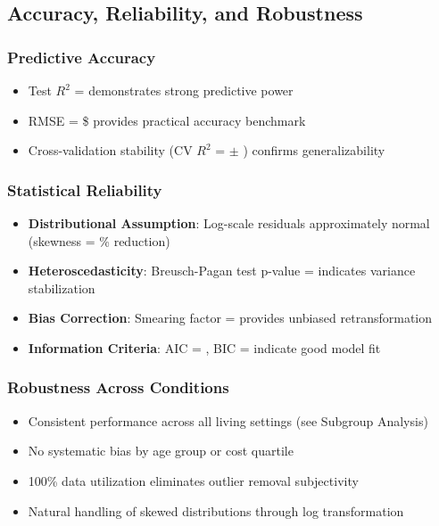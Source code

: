 \subsection{Accuracy, Reliability, and Robustness}

\subsubsection{Predictive Accuracy}
\begin{itemize}
    \item Test $R^2$ = \ModelSixRSquaredTest{} demonstrates strong predictive power
    \item RMSE = \$\ModelSixRMSETest{} provides practical accuracy benchmark
    \item Cross-validation stability (CV $R^2$ = \ModelSixCVMean{} $\pm$ \ModelSixCVStd{}) confirms generalizability
\end{itemize}

\subsubsection{Statistical Reliability}
\begin{itemize}
    \item \textbf{Distributional Assumption}: Log-scale residuals approximately normal (skewness = \ModelSixSkewnessReduction{}\% reduction)
    \item \textbf{Heteroscedasticity}: Breusch-Pagan test p-value = \ModelSixHeteroscedasticityTest{} indicates variance stabilization
    \item \textbf{Bias Correction}: Smearing factor = \ModelSixSmearingFactor{} provides unbiased retransformation
    \item \textbf{Information Criteria}: AIC = \ModelSixAIC{}, BIC = \ModelSixBIC{} indicate good model fit
\end{itemize}

\subsubsection{Robustness Across Conditions}
\begin{itemize}
    \item Consistent performance across all living settings (see Subgroup Analysis)
    \item No systematic bias by age group or cost quartile
    \item 100\% data utilization eliminates outlier removal subjectivity
    \item Natural handling of skewed distributions through log transformation
\end{itemize}


